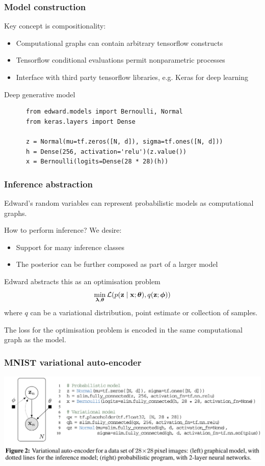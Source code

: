 \documentclass[10pt]{beamer}
\begin{document}
\begin{frame}[fragile]
  \frametitle{Model construction}
  Key concept is compositionality:
  \begin{itemize}
    \item Computational graphs can contain arbitrary tensorflow constructs
    \item Tensorflow conditional evaluations permit nonparametric processes
    \item Interface with third party tensorflow libraries, e.g. Keras for deep learning
  \end{itemize}
  \begin{block}{Deep generative model}
    \begin{verbatim}
      from edward.models import Bernoulli, Normal
      from keras.layers import Dense

      z = Normal(mu=tf.zeros([N, d]), sigma=tf.ones([N, d]))
      h = Dense(256, activation='relu')(z.value())
      x = Bernoulli(logits=Dense(28 * 28)(h))
    \end{verbatim}
  \end{block}
\end{frame}


\begin{frame}
  \frametitle{Inference abstraction}
  Edward's random variables can represent probabilistic models as computational graphs.

  How to perform inference? We desire:
  \begin{itemize}
    \item Support for many inference classes
    \item The posterior can be further composed as part of a larger model
  \end{itemize}

  Edward abstracts this as an optimisation problem
  \begin{align*}
    \label{eq:inference-optimization}
    \min_{\boldsymbol{\mathbf{\lambda}},\boldsymbol{\mathbf{\theta}}}
    \mathcal{L}(
      p(\mathbf{z} \mid \mathbf{x}; \boldsymbol{\mathbf{\theta}}),
      q(\mathbf{z} ; \boldsymbol{\mathbf{\phi}})
    )
  \end{align*}
  where $q$ can be a variational distribution, point estimate or collection of samples.

  The loss for the optimisation problem is encoded in the same computational graph as the model.
\end{frame}


\begin{frame}
  \frametitle{MNIST variational auto-encoder}
  \includegraphics[width=\textwidth]{img/edward-vae.png}
\end{frame}
\end{document}
